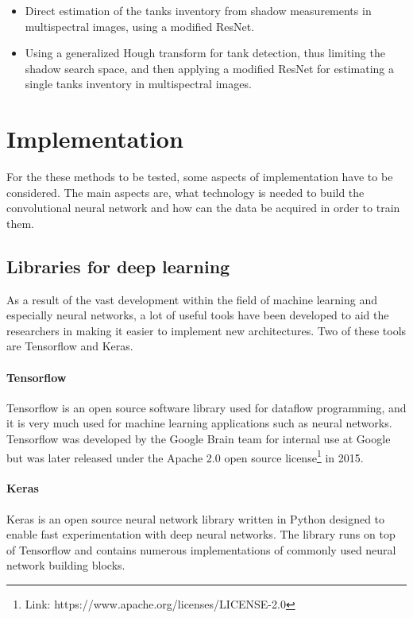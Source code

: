 \begin{itemize}
    \item Direct estimation of the tanks inventory from shadow measurements in multispectral images, using a modified ResNet.
    \item Using a generalized Hough transform for tank detection, thus limiting the shadow search space, and then applying a modified ResNet for estimating a single tanks inventory in multispectral images.
\end{itemize}

\section{Implementation}
For the these methods to be tested, some aspects of implementation have to be considered. The main aspects are, what technology is needed to build the convolutional neural network and how can the data be acquired in order to train them.

\subsection*{Libraries for deep learning}
As a result of the vast development within the field of machine learning and especially neural networks, a lot of useful tools have been developed to aid the researchers in making it easier to implement new architectures. Two of these tools are Tensorflow and Keras.

\paragraph{Tensorflow} Tensorflow is an open source software library used for dataflow programming, and it is very much used for machine learning applications such as neural networks. Tensorflow was developed by the Google Brain team for internal use at Google but was later released under the Apache 2.0 open source license\footnote{Link: https://www.apache.org/licenses/LICENSE-2.0} in 2015.

\paragraph{Keras} Keras is an open source neural network library written in Python designed to enable fast experimentation with deep neural networks. The library runs on top of Tensorflow and contains numerous implementations of commonly used neural network building blocks.

